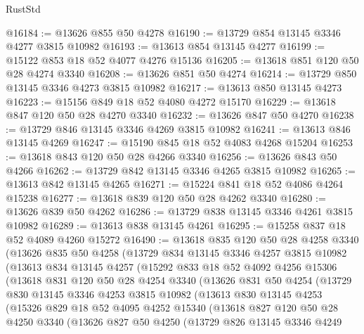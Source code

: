\begin{lexlean}{RustStd}
\begin{coremodule}
@16184 := @13626 @855 @50 @4278
@16190 := @13729 @854 @13145 @3346 @4277 @3815 @10982
@16193 := @13613 @854 @13145 @4277
@16199 := @15122 @853 @18 @52 @4077 @4276 @15136
@16205 := @13618 @851 @120 @50 @28 @4274 @3340
@16208 := @13626 @851 @50 @4274
@16214 := @13729 @850 @13145 @3346 @4273 @3815 @10982
@16217 := @13613 @850 @13145 @4273
@16223 := @15156 @849 @18 @52 @4080 @4272 @15170
@16229 := @13618 @847 @120 @50 @28 @4270 @3340
@16232 := @13626 @847 @50 @4270
@16238 := @13729 @846 @13145 @3346 @4269 @3815 @10982
@16241 := @13613 @846 @13145 @4269
@16247 := @15190 @845 @18 @52 @4083 @4268 @15204
@16253 := @13618 @843 @120 @50 @28 @4266 @3340
@16256 := @13626 @843 @50 @4266
@16262 := @13729 @842 @13145 @3346 @4265 @3815 @10982
@16265 := @13613 @842 @13145 @4265
@16271 := @15224 @841 @18 @52 @4086 @4264 @15238
@16277 := @13618 @839 @120 @50 @28 @4262 @3340
@16280 := @13626 @839 @50 @4262
@16286 := @13729 @838 @13145 @3346 @4261 @3815 @10982
@16289 := @13613 @838 @13145 @4261
@16295 := @15258 @837 @18 @52 @4089 @4260 @15272
@16490 := @13618
    @835
    @120
    @50
    @28
    @4258
    @3340
    (@13626
      @835
      @50
      @4258
      (@13729
        @834
        @13145
        @3346
        @4257
        @3815
        @10982
        (@13613
          @834
          @13145
          @4257
          (@15292
            @833
            @18
            @52
            @4092
            @4256
            @15306
            (@13618
              @831
              @120
              @50
              @28
              @4254
              @3340
              (@13626
                @831
                @50
                @4254
                (@13729
                  @830
                  @13145
                  @3346
                  @4253
                  @3815
                  @10982
                  (@13613
                    @830
                    @13145
                    @4253
                    (@15326
                      @829
                      @18
                      @52
                      @4095
                      @4252
                      @15340
                      (@13618
                        @827
                        @120
                        @50
                        @28
                        @4250
                        @3340
                        (@13626
                          @827
                          @50
                          @4250
                          (@13729
                            @826
                            @13145
                            @3346
                            @4249

\end{coremodule}
\end{lexlean}
